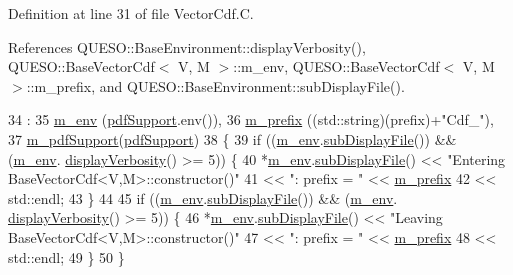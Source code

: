 Definition at line 31 of file Vector\-Cdf.\-C.



References Q\-U\-E\-S\-O\-::\-Base\-Environment\-::display\-Verbosity(), Q\-U\-E\-S\-O\-::\-Base\-Vector\-Cdf$<$ V, M $>$\-::m\-\_\-env, Q\-U\-E\-S\-O\-::\-Base\-Vector\-Cdf$<$ V, M $>$\-::m\-\_\-prefix, and Q\-U\-E\-S\-O\-::\-Base\-Environment\-::sub\-Display\-File().


\begin{DoxyCode}
34   :
35   \hyperlink{class_q_u_e_s_o_1_1_base_vector_cdf_aa1effe370ac016f1fc7eaf538c5751a6}{m\_env}       (\hyperlink{class_q_u_e_s_o_1_1_base_vector_cdf_aaf5088d3994606a9d449ccd414509709}{pdfSupport}.env()),
36   \hyperlink{class_q_u_e_s_o_1_1_base_vector_cdf_ac88b657f25153ab6c03bd65b64cada52}{m\_prefix}    ((std::string)(prefix)+\textcolor{stringliteral}{"Cdf\_"}),
37   \hyperlink{class_q_u_e_s_o_1_1_base_vector_cdf_a4e083383c98725fa83c5c8c133dcfea4}{m\_pdfSupport}(\hyperlink{class_q_u_e_s_o_1_1_base_vector_cdf_aaf5088d3994606a9d449ccd414509709}{pdfSupport})
38 \{
39   \textcolor{keywordflow}{if} ((\hyperlink{class_q_u_e_s_o_1_1_base_vector_cdf_aa1effe370ac016f1fc7eaf538c5751a6}{m\_env}.\hyperlink{class_q_u_e_s_o_1_1_base_environment_a8a0064746ae8dddfece4229b9ad374d6}{subDisplayFile}()) && (\hyperlink{class_q_u_e_s_o_1_1_base_vector_cdf_aa1effe370ac016f1fc7eaf538c5751a6}{m\_env}.
      \hyperlink{class_q_u_e_s_o_1_1_base_environment_a1fe5f244fc0316a0ab3e37463f108b96}{displayVerbosity}() >= 5)) \{
40     *\hyperlink{class_q_u_e_s_o_1_1_base_vector_cdf_aa1effe370ac016f1fc7eaf538c5751a6}{m\_env}.\hyperlink{class_q_u_e_s_o_1_1_base_environment_a8a0064746ae8dddfece4229b9ad374d6}{subDisplayFile}() << \textcolor{stringliteral}{"Entering BaseVectorCdf<V,M>::constructor()"}
41                            << \textcolor{stringliteral}{": prefix = "} << \hyperlink{class_q_u_e_s_o_1_1_base_vector_cdf_ac88b657f25153ab6c03bd65b64cada52}{m\_prefix}
42                            << std::endl;
43   \}
44 
45   \textcolor{keywordflow}{if} ((\hyperlink{class_q_u_e_s_o_1_1_base_vector_cdf_aa1effe370ac016f1fc7eaf538c5751a6}{m\_env}.\hyperlink{class_q_u_e_s_o_1_1_base_environment_a8a0064746ae8dddfece4229b9ad374d6}{subDisplayFile}()) && (\hyperlink{class_q_u_e_s_o_1_1_base_vector_cdf_aa1effe370ac016f1fc7eaf538c5751a6}{m\_env}.
      \hyperlink{class_q_u_e_s_o_1_1_base_environment_a1fe5f244fc0316a0ab3e37463f108b96}{displayVerbosity}() >= 5)) \{
46     *\hyperlink{class_q_u_e_s_o_1_1_base_vector_cdf_aa1effe370ac016f1fc7eaf538c5751a6}{m\_env}.\hyperlink{class_q_u_e_s_o_1_1_base_environment_a8a0064746ae8dddfece4229b9ad374d6}{subDisplayFile}() << \textcolor{stringliteral}{"Leaving BaseVectorCdf<V,M>::constructor()"}
47                            << \textcolor{stringliteral}{": prefix = "} << \hyperlink{class_q_u_e_s_o_1_1_base_vector_cdf_ac88b657f25153ab6c03bd65b64cada52}{m\_prefix}
48                            << std::endl;
49   \}
50 \}
\end{DoxyCode}
